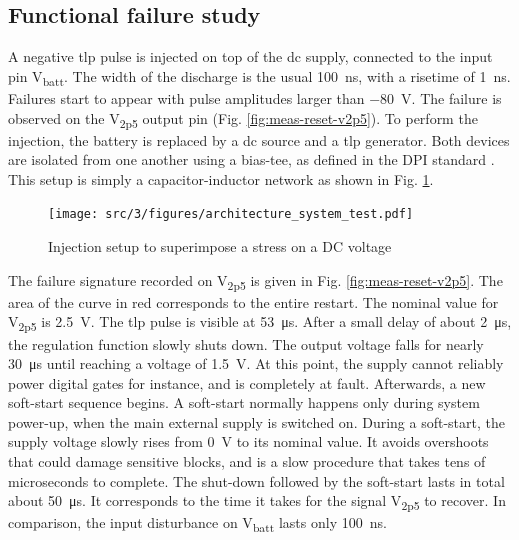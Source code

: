 \subsection{Functional failure study}
\label{sec:failure-case-study}

A negative \gls{tlp} pulse is injected on top of the \gls{dc} supply, connected to the input pin V\textsubscript{batt}.
The width of the discharge is the usual \SI{100}{\nano\second}, with a risetime of \SI{1}{\nano\second}.
Failures start to appear with pulse amplitudes larger than \SI{-80}{\volt}.
The failure is observed on the V\textsubscript{2p5} output pin (Fig. \ref{fig:meas-reset-v2p5}).
To perform the injection, the battery is replaced by a \gls{dc} source and a \gls{tlp} generator.
Both devices are isolated from one another using a \gls{bias-tee}, as defined in the DPI standard \cite{iec62132-4}.
This setup is simply a capacitor-inductor network as shown in Fig. \ref{fig:injection-setup-dpi}.

\begin{figure}[!h]
  \centering
  \texttt{[image: src/3/figures/architecture\_system\_test.pdf]}
  \caption{Injection setup to superimpose a stress on a DC voltage}
  \label{fig:injection-setup-dpi}
\end{figure}

The failure signature recorded on V\textsubscript{2p5} is given in Fig. \ref{fig:meas-reset-v2p5}.
The area of the curve in red corresponds to the entire restart.
The nominal value for V\textsubscript{2p5} is \SI{2.5}{\volt}.
The \gls{tlp} pulse is visible at \SI{53}{\micro\second}.
After a small delay of about \SI{2}{\micro\second}, the regulation function slowly shuts down.
The output voltage falls for nearly \SI{30}{\micro\second} until reaching a voltage of \SI{1.5}{\volt}.
At this point, the supply cannot reliably power digital gates for instance, and is completely at fault.
Afterwards, a new soft-start sequence begins.
A soft-start normally happens only during system power-up, when the main external supply is switched on.
During a soft-start, the supply voltage slowly rises from \SI{0}{\volt} to its nominal value.
It avoids overshoots that could damage sensitive blocks, and is a slow procedure that takes tens of microseconds to complete.
The shut-down followed by the soft-start lasts in total about \SI{50}{\micro\second}.
It corresponds to the time it takes for the signal V\textsubscript{2p5} to recover.
In comparison, the input disturbance on V\textsubscript{batt} lasts only \SI{100}{\nano\second}.

